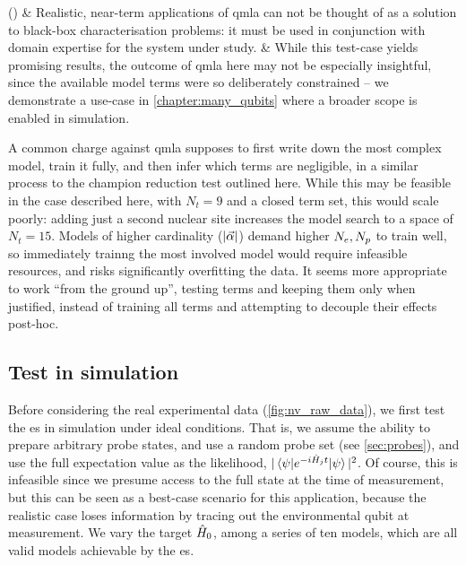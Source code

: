 \begin{easylist}[enumerate]
    \ListProperties()
    & Realistic, near-term applications of \gls{qmla} can not be thought of as a solution to black-box characterisation problems: 
        it must be used in conjunction with domain expertise for the system under study.
    & While this test-case yields promising results, the outcome of \gls{qmla} here may not be especially insightful, 
        since the available model terms were so deliberately constrained -- we demonstrate a use-case in \cref{chapter:many_qubits} 
        where a broader scope is enabled in simulation.    
\end{easylist}   
\par 

A common charge against \gls{qmla} supposes to first write down the most complex model, 
    train it fully, and then infer which terms are negligible, in a similar process to the champion reduction test outlined here. 
While this may be feasible in the case described here, with $N_t=9$ and a closed term set, 
    this would scale poorly: adding just a second nuclear site increases the model search to a space of $N_t=15$.
Models of higher cardinality ($|\vec{\alpha}|$) demand higher $N_e, N_p$ to train well, so immediately trainng the most involved model would 
    require infeasible resources\footnotemark, and risks significantly overfitting the data. 
It seems more appropriate to work ``from the ground up'', testing terms and keeping them only when justified, 
    instead of training all terms and attempting to decouple their effects post-hoc. 

\par 
\subsection{Test in simulation}
Before considering the real experimental data (\cref{fig:nv_raw_data}), 
    we first test the \gls{es} in simulation under ideal conditions. 
That is, we assume the ability to prepare arbitrary \gls{probe} states, 
    and use a random \gls{probe} set (see \cref{sec:probes}),
    and use the full expectation value as the likelihood, $|\braket{\psi | e^{-i \hat{H}_j t} | \psi}|^2$.
Of course, this is infeasible since we presume access to the full state at the time of measurement, 
    but this can be seen as a best-case scenario for this application, 
    because the realistic case loses information by tracing out the environmental qubit at measurement.
We vary the target $\hat{H}_0$, among a series of ten models,
    which are all valid models achievable by the \gls{es}. 


